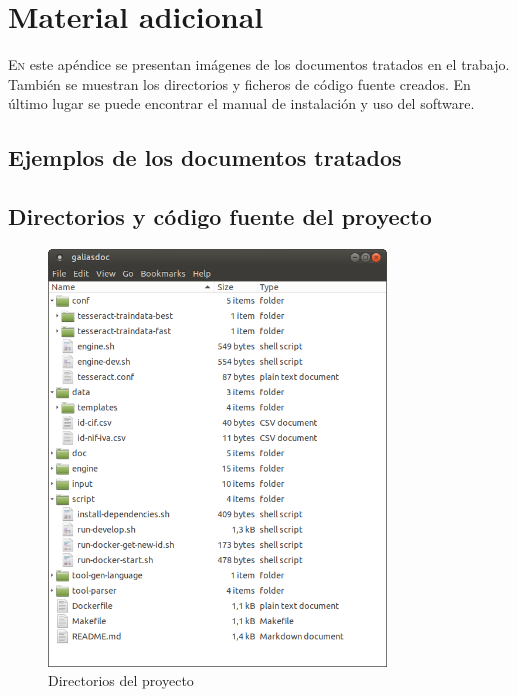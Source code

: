 
\chapter{Material adicional}
\label{chap:adicional-1}

\lettrine{E}{n} este apéndice se presentan imágenes de los documentos tratados en el trabajo. También se muestran los directorios y ficheros de código fuente creados. En último lugar se puede encontrar el manual de instalación y uso del software.

\section{Ejemplos de los documentos tratados}


\section{Directorios y código fuente del proyecto}

\begin{figure}[hp!]
    \centering
    \includegraphics[width=0.8\textwidth]{imaxes/z-adicional/estructura-general.png}
    \caption{Directorios del proyecto}
    \label{fig:directorios-proyecto}
\end{figure}

